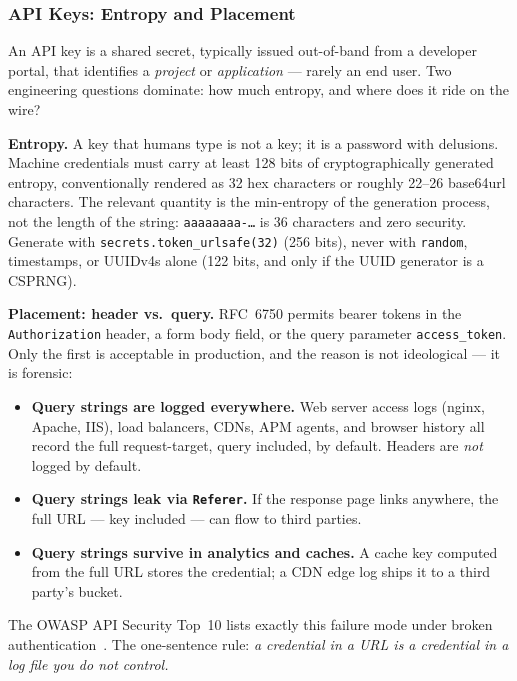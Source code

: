 \subsubsection{API Keys: Entropy and Placement}

An API key is a shared secret, typically issued out-of-band from a developer
portal, that identifies a \emph{project} or \emph{application} --- rarely an
end user. Two engineering questions dominate: how much entropy, and where
does it ride on the wire?

\textbf{Entropy.} A key that humans type is not a key; it is a password with
delusions. Machine credentials must carry at least 128 bits of
cryptographically generated entropy, conventionally rendered as 32 hex
characters or roughly 22--26 base64url characters. The relevant quantity is
the min-entropy of the generation process, not the length of the string:
\texttt{aaaaaaaa-\ldots} is 36 characters and zero security. Generate with
\texttt{secrets.token\_urlsafe(32)} (256 bits), never with
\texttt{random}, timestamps, or UUIDv4s alone (122 bits, and only if the
UUID generator is a CSPRNG).

\textbf{Placement: header vs.\ query.} RFC~6750 permits bearer tokens in the
\texttt{Authorization} header, a form body field, or the query
parameter \texttt{access\_token}. Only the first is acceptable in
production, and the reason is not ideological --- it is forensic:

\begin{itemize}
  \item \textbf{Query strings are logged everywhere.} Web server access
        logs (nginx, Apache, IIS), load balancers, CDNs, APM agents, and
        browser history all record the full request-target, query included,
        by default. Headers are \emph{not} logged by default.
  \item \textbf{Query strings leak via \texttt{Referer}.} If the response
        page links anywhere, the full URL --- key included --- can flow to
        third parties.
  \item \textbf{Query strings survive in analytics and caches.} A cache key
        computed from the full URL stores the credential; a CDN edge log
        ships it to a third party's bucket.
\end{itemize}

The OWASP API Security Top~10 lists exactly this failure mode under broken
authentication~\cite{owaspapisecurity}. The one-sentence rule: \emph{a
credential in a URL is a credential in a log file you do not control.}

